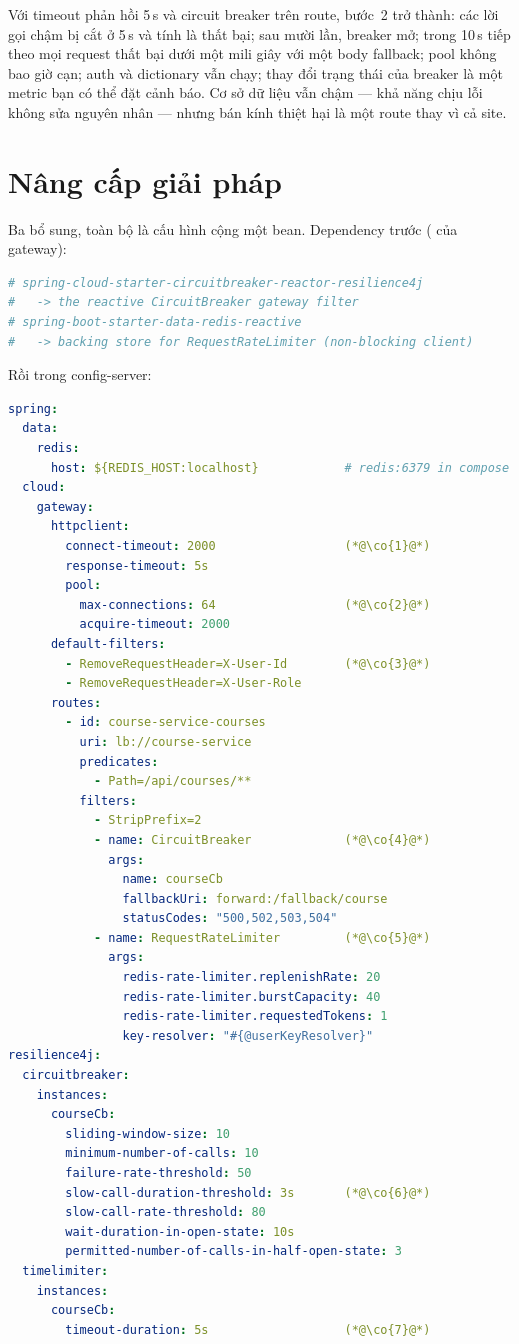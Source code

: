 Với timeout phản hồi 5\,s và circuit breaker trên route, bước~2 trở
thành: các lời gọi chậm bị cắt ở 5\,s và tính là thất bại; sau mười
lần, breaker mở; trong 10\,s tiếp theo mọi request 
thất bại dưới một mili giây với một body fallback; pool không bao giờ
cạn; auth và dictionary vẫn chạy; thay đổi trạng thái của breaker là
một metric bạn có thể đặt cảnh báo. Cơ sở dữ liệu vẫn chậm --- khả
năng chịu lỗi không sửa nguyên nhân --- nhưng bán kính thiệt hại là một
route thay vì cả site.

\section{Nâng cấp giải pháp}
\label{sec:gw-enhance}

Ba bổ sung, toàn bộ là cấu hình cộng một bean. Dependency trước
( của gateway):

\begin{lstlisting}[language=yaml]
# spring-cloud-starter-circuitbreaker-reactor-resilience4j
#   -> the reactive CircuitBreaker gateway filter
# spring-boot-starter-data-redis-reactive
#   -> backing store for RequestRateLimiter (non-blocking client)
\end{lstlisting}

Rồi  trong config-server:

\begin{lstlisting}[language=yaml]
spring:
  data:
    redis:
      host: ${REDIS_HOST:localhost}            # redis:6379 in compose
  cloud:
    gateway:
      httpclient:
        connect-timeout: 2000                  (*@\co{1}@*)
        response-timeout: 5s
        pool:
          max-connections: 64                  (*@\co{2}@*)
          acquire-timeout: 2000
      default-filters:
        - RemoveRequestHeader=X-User-Id        (*@\co{3}@*)
        - RemoveRequestHeader=X-User-Role
      routes:
        - id: course-service-courses
          uri: lb://course-service
          predicates:
            - Path=/api/courses/**
          filters:
            - StripPrefix=2
            - name: CircuitBreaker             (*@\co{4}@*)
              args:
                name: courseCb
                fallbackUri: forward:/fallback/course
                statusCodes: "500,502,503,504"
            - name: RequestRateLimiter         (*@\co{5}@*)
              args:
                redis-rate-limiter.replenishRate: 20
                redis-rate-limiter.burstCapacity: 40
                redis-rate-limiter.requestedTokens: 1
                key-resolver: "#{@userKeyResolver}"
resilience4j:
  circuitbreaker:
    instances:
      courseCb:
        sliding-window-size: 10
        minimum-number-of-calls: 10
        failure-rate-threshold: 50
        slow-call-duration-threshold: 3s       (*@\co{6}@*)
        slow-call-rate-threshold: 80
        wait-duration-in-open-state: 10s
        permitted-number-of-calls-in-half-open-state: 3
  timelimiter:
    instances:
      courseCb:
        timeout-duration: 5s                   (*@\co{7}@*)
\end{lstlisting}

